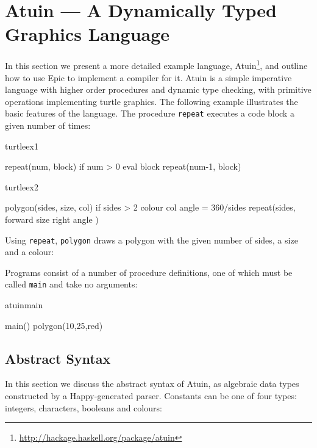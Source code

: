 \section{Atuin --- A Dynamically Typed Graphics Language}

In this section we present a more detailed example language,
Atuin\footnote{\url{http://hackage.haskell.org/package/atuin}}, and
outline how to use Epic to implement a compiler for it. Atuin is a simple
imperative language with higher order procedures and dynamic type
checking, with primitive operations implementing turtle graphics.
The following example illustrates the basic features of the
language. The procedure \texttt{repeat} executes a code block a given
number of times:

\begin{SaveVerbatim}{turtleex1}

repeat(num, block) {
  if num > 0 {
     eval block
     repeat(num-1, block)
  }
}

\end{SaveVerbatim}
\begin{SaveVerbatim}{turtleex2}

polygon(sides, size, col) {
  if sides > 2 {
    colour col
    angle = 360/sides
    repeat(sides, {
      forward size
      right angle
    })
  }
}

\end{SaveVerbatim}


\noindent
Using \texttt{repeat}, \texttt{polygon} draws a polygon
with the given number of sides, a size and a colour:


\noindent
Programs consist of a number of procedure definitions, one of which
must be called \texttt{main} and take no arguments:

\begin{SaveVerbatim}{atuinmain}

main() {
  polygon(10,25,red)
}

\end{SaveVerbatim}

\subsection{Abstract Syntax}

In this section we discuss the abstract syntax of Atuin, as algebraic
data types constructed by a Happy-generated parser. Constants can be
one of four types: integers, characters, booleans and colours:

